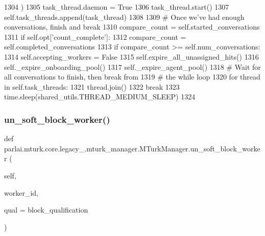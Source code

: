 \begin{DoxyCode}
1304                     )
1305                     task\_thread.daemon = \textcolor{keyword}{True}
1306                     task\_thread.start()
1307                     self.task\_threads.append(task\_thread)
1308 
1309             \textcolor{comment}{# Once we've had enough conversations, finish and break}
1310             compare\_count = self.started\_conversations
1311             \textcolor{keywordflow}{if} self.opt[\textcolor{stringliteral}{'count\_complete'}]:
1312                 compare\_count = self.completed\_conversations
1313             \textcolor{keywordflow}{if} compare\_count >= self.num\_conversations:
1314                 self.accepting\_workers = \textcolor{keyword}{False}
1315                 self.expire\_all\_unassigned\_hits()
1316                 self.\_expire\_onboarding\_pool()
1317                 self.\_expire\_agent\_pool()
1318                 \textcolor{comment}{# Wait for all conversations to finish, then break from}
1319                 \textcolor{comment}{# the while loop}
1320                 \textcolor{keywordflow}{for} thread \textcolor{keywordflow}{in} self.task\_threads:
1321                     thread.join()
1322                 \textcolor{keywordflow}{break}
1323             time.sleep(shared\_utils.THREAD\_MEDIUM\_SLEEP)
1324 
\end{DoxyCode}
\mbox{\label{classparlai_1_1mturk_1_1core_1_1legacy__2018_1_1mturk__manager_1_1MTurkManager_ab4af6a172516c9f22be1e71640846423}} 
\subsubsection{\texorpdfstring{un\+\_\+soft\+\_\+block\+\_\+worker()}{un\_soft\_block\_worker()}}
{\footnotesize\ttfamily def parlai.\+mturk.\+core.\+legacy\+\_.\+mturk\+\_\+manager.\+M\+Turk\+Manager.\+un\+\_\+soft\+\_\+block\+\_\+worker (\begin{DoxyParamCaption}\item[{}]{self,  }\item[{}]{worker\+\_\+id,  }\item[{}]{qual = {\ttfamily \textquotesingle{}block\+\_\+qualification\textquotesingle{}} }\end{DoxyParamCaption})}

